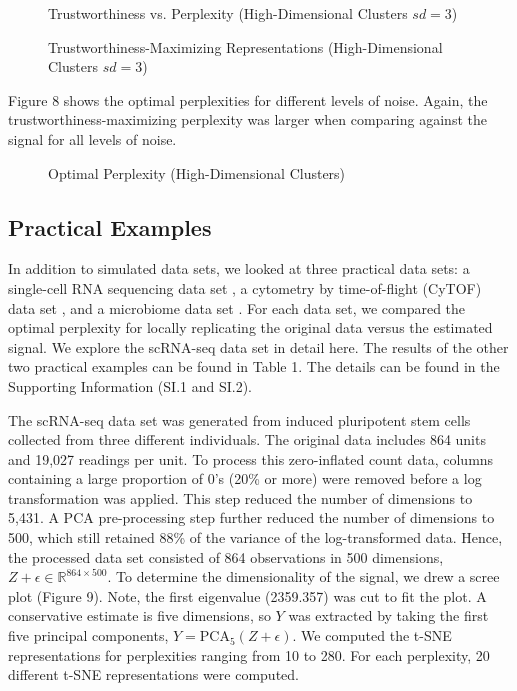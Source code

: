 \documentclass{article}
\begin{document}
\renewcommand{\thefigure}{6}
\begin{figure}[H]
\centering
\caption{Trustworthiness vs. Perplexity (High-Dimensional Clusters $sd = 3$)}
\end{figure}

\renewcommand{\thefigure}{7}
\begin{figure}[H]
\centering
\caption{Trustworthiness-Maximizing Representations (High-Dimensional Clusters $sd = 3$)}
\end{figure}

Figure 8 shows the optimal perplexities for different levels of noise. Again, the trustworthiness-maximizing perplexity was larger when comparing against the signal for all levels of noise.

\renewcommand{\thefigure}{8}
\begin{figure}[H]
\centering
\caption{Optimal Perplexity (High-Dimensional Clusters)}
\end{figure}

\subsection{Practical Examples}
In addition to simulated data sets, we looked at three practical data sets: a single-cell RNA sequencing data set \cite{scRNA data}, a cytometry by time-of-flight (CyTOF) data set \cite{CyTOF data}, and a microbiome data set \cite{enterotype data}. For each data set, we compared the optimal perplexity for locally replicating the original data versus the estimated signal. We explore the scRNA-seq data set in detail here. The results of the other two practical examples can be found in Table 1. The details can be found in the Supporting Information (SI.1 and SI.2).

The scRNA-seq data set was generated from induced pluripotent stem cells collected from three different individuals. The original data includes 864 units and 19,027 readings per unit. To process this zero-inflated count data, columns containing a large proportion of 0's (20\% or more) were removed before a log transformation was applied. This step reduced the number of dimensions to 5,431. A PCA pre-processing step further reduced the number of dimensions to 500, which still retained 88\% of the variance of the log-transformed data. Hence, the processed data set consisted of 864 observations in 500 dimensions, $Z + \epsilon \in \mathbb{R}^{864 \times 500}$. To determine the dimensionality of the signal, we drew a scree plot (Figure 9). Note, the first eigenvalue (2359.357) was cut to fit the plot. A conservative estimate is five dimensions, so $Y$ was extracted by taking the first five principal components, $Y = \textrm{PCA}_5(Z + \epsilon)$. We computed the t-SNE representations for perplexities ranging from 10 to 280. For each perplexity, 20 different t-SNE representations were computed.
\end{document}
